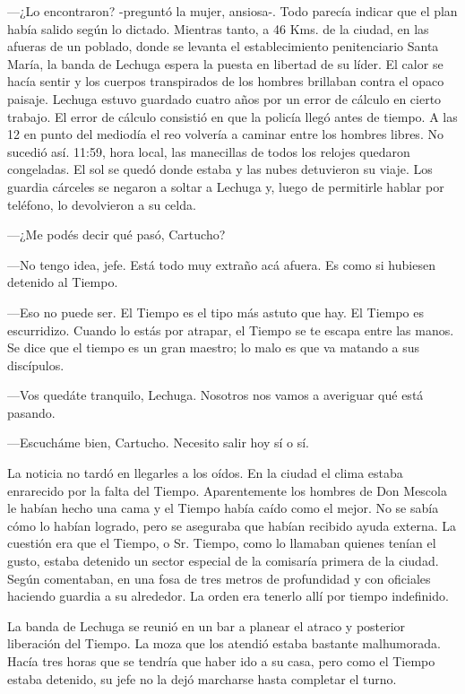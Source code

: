 \documentclass[11pt,twoside,openright,a5paper]{book}
\begin{document}
---¿Lo encontraron? -preguntó la mujer, ansiosa-. Todo parecía indicar que el plan había salido según lo dictado.
Mientras tanto, a 46 Kms. de la ciudad, en las afueras de un poblado, donde se levanta el establecimiento penitenciario Santa María, la banda de Lechuga espera la puesta en libertad de su líder. El calor se hacía sentir y los cuerpos transpirados de los hombres brillaban contra el opaco paisaje. Lechuga estuvo guardado cuatro años por un error de cálculo en cierto trabajo. El error de cálculo consistió en que la policía llegó antes de tiempo. A las 12 en punto del mediodía el reo volvería a caminar entre los hombres libres. No sucedió así. 11:59, hora local, las manecillas de todos los relojes quedaron congeladas. El sol se quedó donde estaba y las nubes detuvieron su viaje. Los guardia cárceles se negaron a soltar a Lechuga y, luego de permitirle hablar por teléfono, lo devolvieron a su celda.

---¿Me podés decir qué pasó, Cartucho?

---No tengo idea, jefe. Está todo muy extraño acá afuera. Es como si hubiesen detenido al Tiempo.

---Eso no puede ser. El Tiempo es el tipo más astuto que hay. El Tiempo es escurridizo. Cuando lo estás por atrapar, el Tiempo se te escapa entre las manos. Se dice que el tiempo es un gran maestro; lo malo es que va matando a sus discípulos.

---Vos quedáte tranquilo, Lechuga. Nosotros nos vamos a averiguar qué está pasando.

---Escucháme bien, Cartucho. Necesito salir hoy sí o sí.

La noticia no tardó en llegarles a los oídos. En la ciudad el clima estaba enrarecido por la falta del Tiempo. Aparentemente los hombres de Don Mescola le habían hecho una cama y el Tiempo había caído como el mejor. No se sabía cómo lo habían logrado, pero se aseguraba que habían recibido ayuda externa. La cuestión era que el Tiempo, o Sr. Tiempo, como lo llamaban quienes tenían el gusto, estaba detenido un sector especial de la comisaría primera de la ciudad. Según comentaban, en una fosa de tres metros de profundidad y con oficiales haciendo guardia a su alrededor. La orden era tenerlo allí por tiempo indefinido.

La banda de Lechuga se reunió en un bar a planear el atraco y posterior liberación del Tiempo. La moza que los atendió estaba bastante malhumorada. Hacía tres horas que se tendría que haber ido a su casa, pero como el Tiempo estaba detenido, su jefe no la dejó marcharse hasta completar el turno.
\end{document}
